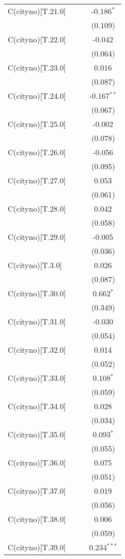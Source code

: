 \begin{table}[!htbp]
\begin{tabular}{@{\extracolsep{5pt}}lccc}
 C(cityno)[T.21.0] & & & -0.186$^{*}$ \\
& & & (0.109) \\
 C(cityno)[T.22.0] & & & -0.042$^{}$ \\
& & & (0.064) \\
 C(cityno)[T.23.0] & & & 0.016$^{}$ \\
& & & (0.087) \\
 C(cityno)[T.24.0] & & & -0.167$^{**}$ \\
& & & (0.067) \\
 C(cityno)[T.25.0] & & & -0.002$^{}$ \\
& & & (0.078) \\
 C(cityno)[T.26.0] & & & -0.056$^{}$ \\
& & & (0.095) \\
 C(cityno)[T.27.0] & & & 0.053$^{}$ \\
& & & (0.061) \\
 C(cityno)[T.28.0] & & & 0.042$^{}$ \\
& & & (0.058) \\
 C(cityno)[T.29.0] & & & -0.005$^{}$ \\
& & & (0.036) \\
 C(cityno)[T.3.0] & & & 0.026$^{}$ \\
& & & (0.087) \\
 C(cityno)[T.30.0] & & & 0.662$^{*}$ \\
& & & (0.349) \\
 C(cityno)[T.31.0] & & & -0.030$^{}$ \\
& & & (0.054) \\
 C(cityno)[T.32.0] & & & 0.014$^{}$ \\
& & & (0.052) \\
 C(cityno)[T.33.0] & & & 0.108$^{*}$ \\
& & & (0.059) \\
 C(cityno)[T.34.0] & & & 0.028$^{}$ \\
& & & (0.034) \\
 C(cityno)[T.35.0] & & & 0.093$^{*}$ \\
& & & (0.055) \\
 C(cityno)[T.36.0] & & & 0.075$^{}$ \\
& & & (0.051) \\
 C(cityno)[T.37.0] & & & 0.019$^{}$ \\
& & & (0.056) \\
 C(cityno)[T.38.0] & & & 0.006$^{}$ \\
& & & (0.059) \\
 C(cityno)[T.39.0] & & & 0.234$^{***}$ \\

\end{tabular}
\end{table}
